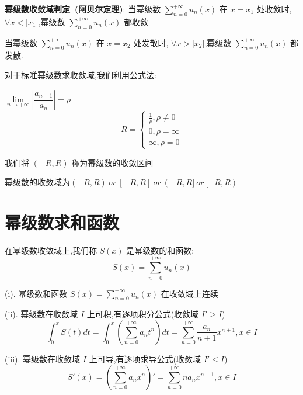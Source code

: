 \begin{theorem}[阿贝尔定理]\label{the: 幂级数收敛区间(收敛半径)和收敛域}
	\textbf{幂级数收敛域判定\ (阿贝尔定理)}:
	当幂级数 $\sum\limits_{n=0}^{+\infty}u_{n}(x)$ 在 $x=x_{1}$ 处收敛时, $\forall x<|x_{1}|$,幂级数 $\sum\limits_{n=0}^{+\infty}u_{n}(x)$ 都收敛

	当幂级数 $\sum\limits_{n=0}^{+\infty}u_{n}(x)$ 在 $x=x_{2}$ 处发散时, $\forall x>|x_{2}|$,幂级数 $\sum\limits_{n=0}^{+\infty}u_{n}(x)$ 都发散.
\end{theorem}
对于标准幂级数求收敛域,我们利用公式法:
\begin{theorem}
	$\lim\limits_{n\rightarrow +\infty}|\dfrac{a_{n+1}}{a_{n}}|=\rho$
	$$R=\left\lbrace \begin{matrix}
			\frac{1}{\rho},\rho \neq 0 \\
			0,\rho = \infty            \\
			\infty,\rho = 0
		\end{matrix}\right. $$
\end{theorem}
我们将 $(-R,R)$ 称为幂级数的收敛区间

幂级数的收敛域为$(-R,R) \ or \ [-R,R]\ or\ (-R,R] \ or\ [-R,R) $
\section{幂级数求和函数}


\begin{definition}[幂级数的和函数]\label{def: 幂级数求和函数}
	在幂级数收敛域上,我们称 $S(x)$ 是幂级数的和函数:
	$$S(x)=\sum\limits_{n=0}^{+\infty}u_{n}(x)$$
\end{definition}
\begin{theorem}[可积性与可导性]

	(i). 幂级数和函数 $S(x)=\sum\limits_{n=0}^{+\infty}u_{n}(x)$ 在收敛域上连续

	(ii). 幂级数在收敛域 $I$ 上可积,有逐项积分公式(收敛域 $I'\geq I$)
	$$\int_{0}^{x}S(t)dt=\int_{0}^{x}(\sum\limits_{n=0}^{+\infty}a_{n}t^{n})dt=\sum\limits_{n=0}^{+\infty}\frac{a_{n}}{n+1}x^{n+1},x\in I$$

	(iii). 幂级数在收敛域 $I$ 上可导,有逐项求导公式(收敛域 $I'\leq I$)
	$$S'(x)=(\sum\limits_{n=0}^{+\infty}a_{n}x^{n})'=\sum\limits_{n=0}^{+\infty}na_{n}x^{n-1},x\in I$$
\end{theorem}
